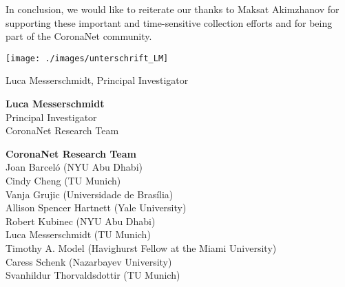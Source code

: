 \documentclass[
]{article}
\begin{document}
In conclusion, we would like to reiterate our thanks to Maksat
Akimzhanov for supporting these important and time-sensitive collection
efforts and for being part of the CoronaNet community.

\vspace{1cm}

\texttt{[image: ./images/unterschrift\_LM]}

Luca Messerschmidt, Principal Investigator

\fontsize{12}{4}\selectfont
\vspace{0.3cm}
\setlength{\baselineskip}{0.5cm}

\textbf{Luca Messerschmidt}\\
Principal Investigator\\
CoronaNet Research Team

\vspace{0.1cm}

\textbf{CoronaNet Research Team}\\
Joan Barceló (NYU Abu Dhabi)\\
Cindy Cheng (TU Munich)\\
Vanja Grujic (Universidade de Brasília)\\
Allison Spencer Hartnett (Yale University)\\
Robert Kubinec (NYU Abu Dhabi)\\
Luca Messerschmidt (TU Munich)\\
Timothy A. Model (Havighurst Fellow at the Miami University)\\
Caress Schenk (Nazarbayev University)\\
Svanhildur Thorvaldsdottir (TU Munich)\\
\end{document}
